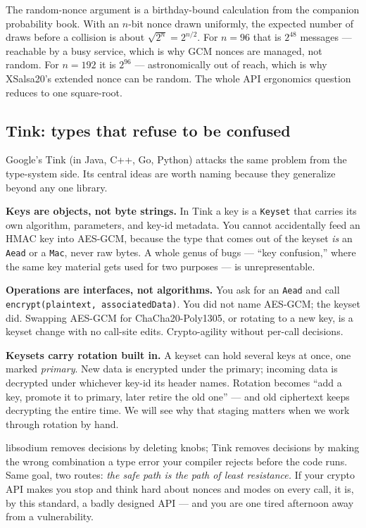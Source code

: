 \begin{connectionbox}
The random-nonce argument is a birthday-bound calculation from the companion
probability book. With an $n$-bit nonce drawn uniformly, the expected number of
draws before a collision is about $\sqrt{2^{n}} = 2^{n/2}$. For $n = 96$ that is
$2^{48}$ messages --- reachable by a busy service, which is why GCM nonces are
managed, not random. For $n = 192$ it is $2^{96}$ --- astronomically out of reach,
which is why XSalsa20's extended nonce can be random. The whole API ergonomics
question reduces to one square-root.
\end{connectionbox}

\subsection{Tink: types that refuse to be confused}

Google's Tink (in Java, C++, Go, Python) attacks the same problem from the
type-system side. Its central ideas are worth naming because they generalize
beyond any one library.

\textbf{Keys are objects, not byte strings.} In Tink a key is a \texttt{Keyset}
that carries its own algorithm, parameters, and key-id metadata. You cannot
accidentally feed an HMAC key into AES-GCM, because the type that comes out of the
keyset \emph{is} an \texttt{Aead} or a \texttt{Mac}, never raw bytes. A whole genus
of bugs --- ``key confusion,'' where the same key material gets used for two
purposes --- is unrepresentable.

\textbf{Operations are interfaces, not algorithms.} You ask for an \texttt{Aead}
and call \texttt{encrypt(plaintext, associatedData)}. You did not name AES-GCM; the
keyset did. Swapping AES-GCM for ChaCha20-Poly1305, or rotating to a new key, is a
keyset change with no call-site edits. Crypto-agility without per-call decisions.

\textbf{Keysets carry rotation built in.} A keyset can hold several keys at once,
one marked \emph{primary}. New data is encrypted under the primary; incoming data
is decrypted under whichever key-id its header names. Rotation becomes ``add a key,
promote it to primary, later retire the old one'' --- and old ciphertext keeps
decrypting the entire time. We will see why that staging matters when we work
through rotation by hand.

\begin{intuitionbox}
libsodium removes decisions by deleting knobs; Tink removes decisions by making the
wrong combination a type error your compiler rejects before the code runs. Same
goal, two routes: \emph{the safe path is the path of least resistance.} If your
crypto API makes you stop and think hard about nonces and modes on every call, it
is, by this standard, a badly designed API --- and you are one tired afternoon away
from a vulnerability.
\end{intuitionbox}

